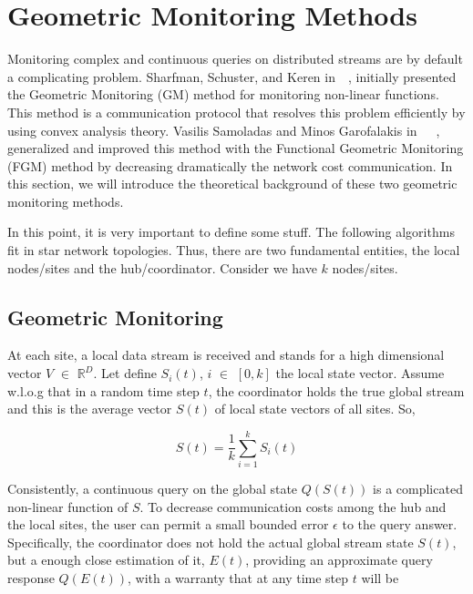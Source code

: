 \section{Geometric Monitoring Methods}\label{sec:geometric-monitoring-methods}

Monitoring complex and continuous queries on distributed streams are by default a complicating problem.
Sharfman, Schuster, and Keren in~\cite{sharfman_geometric_2007}~\cite{sharfman_aggregate_2007}, initially presented the Geometric Monitoring (GM) method for monitoring non-linear functions.
This method is a communication protocol that resolves this problem efficiently by using convex analysis theory.
Vasilis Samoladas and Minos Garofalakis in~\cite{garofalakis_sketch-based_2013}~\cite{garofalakis_distributed_nodate}~\cite{samoladas_functional_nodate}, generalized and improved this method with the Functional Geometric Monitoring (FGM) method by decreasing dramatically the network cost communication.
In this section, we will introduce the theoretical background of these two geometric monitoring methods.

In this point, it is very important to define some stuff.
The following algorithms fit in star network topologies.
Thus, there are two fundamental entities, the local nodes/sites and the hub/coordinator.
Consider we have $k$ nodes/sites.

\subsection{Geometric Monitoring}\label{subsec:geometric-monitoring}

    At each site, a local data stream is received and stands for a high dimensional vector $V$ $\in$ $\mathbb{R}^D$.
Let define $S_i(t)$, $i$ $\in$ $[0,k]$ the local state vector.
Assume w.l.o.g that in a random time step $t$, the coordinator holds the true global stream and
this is the average vector $S(t)$ of local state vectors of all sites.
So,

\begin{equation}
    S(t) = \frac{1}{k} \sum_{i=1}^{k} S_i(t)\label{eq:equation}
\end{equation}

Consistently, a continuous query on the global state $Q(S(t))$ is a complicated non-linear function of $S$.
To decrease communication costs among the hub and the local sites, the user can permit a small bounded error $\epsilon$ to the query answer.
Specifically, the coordinator does not hold the actual global stream state $S(t)$, but a enough close estimation of it, $E(t)$,
providing an approximate query response $Q(E(t))$, with a warranty that at any time step $t$ will be

